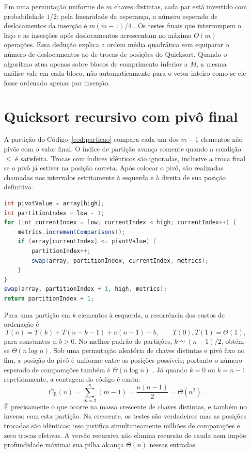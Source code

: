 Em uma permutação uniforme de $m$ chaves distintas, cada par está invertido com probabilidade $1/2$; pela linearidade da esperança, o número esperado de deslocamentos da inserção é $m(m-1)/4$ \cite{gfg_insertion_complexity}. Os testes finais que interrompem o laço e as inserções após deslocamentos acrescentam no máximo $O(m)$ operações. Essa dedução explica a ordem média quadrática sem equiparar o número de deslocamentos ao de trocas de posições do Quicksort. Quando o algoritmo atua apenas sobre blocos de comprimento inferior a $M$, a mesma análise vale em cada bloco, não automaticamente para o vetor inteiro como se ele fosse ordenado apenas por inserção.

\section{Quicksort recursivo com pivô final}

A partição do Código~\ref{cod:particao} compara cada um dos $m-1$ elementos não pivôs com o valor final. O índice de partição avança somente quando a condição $\leq$ é satisfeita. Trocas com índices idênticos são ignoradas, inclusive a troca final se o pivô já estiver na posição correta. Após colocar o pivô, são realizadas chamadas nos intervalos estritamente à esquerda e à direita de sua posição definitiva.

\begin{lstlisting}[language=Java,caption={Partição usada por RecursiveQuickSort.java e HybridQuickSort.java},label={cod:particao}]
int pivotValue = array[high];
int partitionIndex = low - 1;
for (int currentIndex = low; currentIndex < high; currentIndex++) {
    metrics.incrementComparisons();
    if (array[currentIndex] <= pivotValue) {
        partitionIndex++;
        swap(array, partitionIndex, currentIndex, metrics);
    }
}
swap(array, partitionIndex + 1, high, metrics);
return partitionIndex + 1;
\end{lstlisting}

Para uma partição em $k$ elementos à esquerda, a recorrência dos custos de ordenação é
\begin{equation}
 T(n)=T(k)+T(n-k-1)+a(n-1)+b,\qquad T(0),T(1)=\Theta(1),
 \label{eq:quick}
\end{equation}
para constantes $a,b>0$. No melhor padrão de partições, $k\simeq(n-1)/2$, obtém-se $\Theta(n\log n)$. Sob uma permutação aleatória de chaves distintas e pivô fixo no fim, a posição do pivô é uniforme entre as posições possíveis; portanto o número esperado de comparações também é $\Theta(n\log n)$ \cite{cormen2012}. Já quando $k=0$ ou $k=n-1$ repetidamente, a contagem do código é exata:
\begin{equation}
 C_{\mathrm{R}}(n)=\sum_{m=2}^{n}(m-1)=\frac{n(n-1)}{2}=\Theta(n^2).
 \label{eq:quadratico}
\end{equation}
É precisamente o que ocorre na massa crescente de chaves distintas, e também no inverso com esta partição. Na crescente, os testes são verdadeiros mas as posições trocadas são idênticas; isso justifica simultaneamente milhões de comparações e zero trocas efetivas. A versão recursiva não elimina recursão de cauda nem impõe profundidade máxima: sua pilha alcança $\Theta(n)$ nessas entradas.

